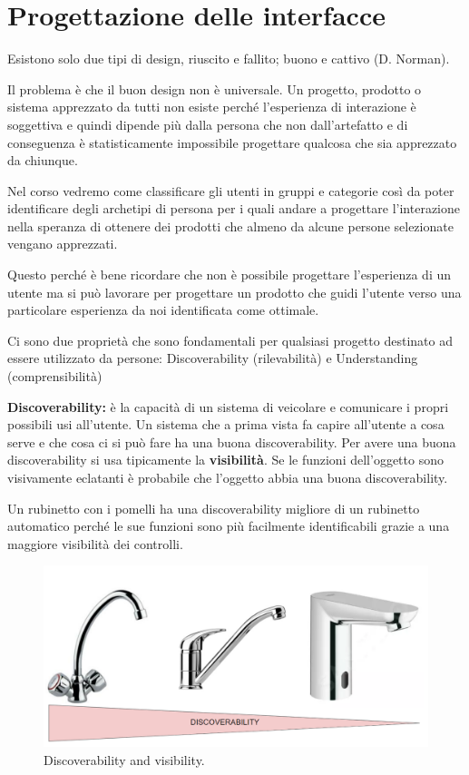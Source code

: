 \chapter{Progettazione delle interfacce}
Esistono solo due tipi di design, riuscito e fallito; buono e cattivo (D. Norman).

Il problema è che il buon design non è universale. Un progetto, prodotto o sistema apprezzato da tutti non esiste perché l'esperienza di interazione è soggettiva e quindi dipende più dalla persona che non dall'artefatto e di conseguenza è statisticamente impossibile progettare qualcosa che sia apprezzato da chiunque.

Nel corso vedremo come classificare gli utenti in gruppi e categorie così da poter identificare degli archetipi di persona per i quali andare a progettare l'interazione nella speranza di ottenere dei prodotti che almeno da alcune persone selezionate vengano apprezzati.

Questo perché è bene ricordare che non è possibile progettare l'esperienza di un utente ma si può lavorare per progettare un prodotto che guidi l'utente verso una particolare esperienza da noi identificata come ottimale.

Ci sono due proprietà che sono fondamentali per qualsiasi progetto destinato ad essere utilizzato da persone: Discoverability (rilevabilità) e Understanding (comprensibilità)

\textbf{Discoverability:} è la capacità di un sistema di veicolare e comunicare i propri possibili usi all'utente. Un sistema che a prima vista fa capire all'utente a cosa serve e che cosa ci si può fare ha una buona discoverability. Per avere una buona discoverability si usa tipicamente la \textbf{visibilità}. Se le funzioni dell'oggetto sono visivamente eclatanti è probabile che l'oggetto abbia una buona discoverability.

Un rubinetto con i pomelli ha una discoverability migliore di un rubinetto automatico perché le sue funzioni sono più facilmente identificabili grazie a una maggiore visibilità dei controlli.


\begin{figure}[!h]
	\centering
	\includegraphics[width=\textwidth]{immagini/discoverability.png}
	\caption{Discoverability and visibility.}
\end{figure}



